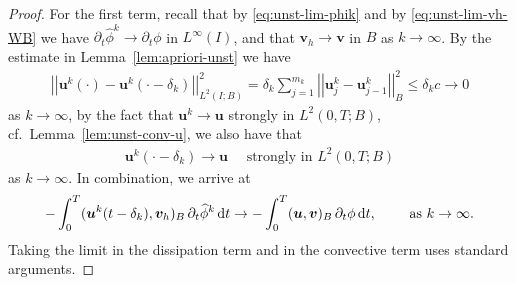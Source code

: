 \documentclass[reqno,a4paper]{amsart}
\def\norm#1{\left|\!\left| #1 \right|\!\right|}
\def\vec#1{\boldsymbol{#1}}
\def\d{{\rm d}}
\def\dt{\,\d t}
\def\bu{\vec{u}}
\def\bv{\vec{v}}
\begin{document}
\begin{proof}
	For the first term, recall that by \eqref{eq:unst-lim-phik} and by \eqref{eq:unst-lim-vh-WB} we have $\partial_t \widehat{\phi}^k \to \partial_t \phi$ in $L^\infty(I)$, and that $ \bv_h \to  \bv$ in $B$ as $k \to \infty$.
	By the estimate in Lemma~\ref{lem:apriori-unst} we have 
	\begin{align}\label{eq:unst-lim-1-b}
		\norm{  \bu^k(\cdot) - \bu^k(\cdot-\delta_k) }_{L^2(I;B)}^2 = \delta_k\sum_{j = 1}^{m_k} 
		\norm{ {\bu}^{k}_j   -{\bu}^{k}_{j-1} }_B^2  \leq \delta_k c \to 0
	\end{align}
	as $k \to \infty$, by the fact that $ \bu^k \to \bu$ strongly in $L^2(0,T;B)$, cf.~Lemma~\ref{lem:unst-conv-u}, we also have that 
	\begin{align}\label{eq:unst-lim-1c}
		\bu^k(\cdot-\delta_k) \to \bu \quad \text{ strongly in } L^2(0,T;B)
	\end{align}
	as $k \to \infty$. 
	In combination, we arrive at  
	\begin{align}\label{eq:unst-lim-1}
		-  \int_0^T ( \bu^k(t-\delta_k), \bv_h)_B \, \partial_t \widehat{\phi}^k \dt 
		\to 
		- \int_0^T ( \bu,  \bv)_B\, \partial_t\phi \dt, 
		\qquad \text{ as } k \to \infty. 
	\end{align} 
	Taking the limit in the dissipation term and in the convective term uses standard arguments.
	

\end{proof}
\end{document}
